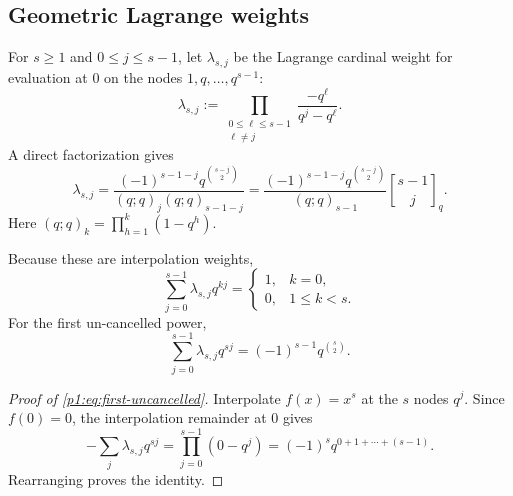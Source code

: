 \documentclass[11pt]{article}
\numberwithin{equation}{section}
\theoremstyle{definition}
\theoremstyle{remark}
\newcommand{\qbinom}[3]{\genfrac{[}{]}{0pt}{}{#1}{#2}_{#3}}
\begin{document}
\subsection{Geometric Lagrange weights}

For $s\ge1$ and $0\le j\le s-1$, let $\lambda_{s,j}$ be the Lagrange cardinal weight for evaluation at $0$ on the nodes $1,q,\ldots,q^{s-1}$:
\begin{equation}
 \lambda_{s,j}:=\prod_{\substack{0\le\ell\le s-1\\\ell\ne j}}
 \frac{-q^\ell}{q^j-q^\ell}.
 \label{p1:eq:lambda-Lagrange}
\end{equation}
A direct factorization gives
\begin{equation}
 \boxed{
 \lambda_{s,j}
 =\frac{(-1)^{s-1-j}q^{\binom{s-j}{2}}}
 {(q;q)_j(q;q)_{s-1-j}}
 =\frac{(-1)^{s-1-j}q^{\binom{s-j}{2}}}{(q;q)_{s-1}}
 \qbinom{s-1}{j}{q}.}
 \label{p1:eq:lambda-qbinomial}
\end{equation}
Here
\((q;q)_k=\prod_{h=1}^{k}(1-q^h)\).

Because these are interpolation weights,
\begin{equation}
 \sum_{j=0}^{s-1}\lambda_{s,j}q^{kj}
 =\begin{cases}
 1,&k=0,\\
 0,&1\le k<s.
 \end{cases}
 \label{p1:eq:lambda-cancellation}
\end{equation}
For the first un-cancelled power,
\begin{equation}
 \sum_{j=0}^{s-1}\lambda_{s,j}q^{sj}
 =(-1)^{s-1}q^{\binom s2}.
 \label{p1:eq:first-uncancelled}
\end{equation}

\begin{proof}[Proof of \eqref{p1:eq:first-uncancelled}]
Interpolate $f(x)=x^s$ at the $s$ nodes $q^j$.  Since $f(0)=0$, the interpolation remainder at $0$ gives
\[
 -\sum_j\lambda_{s,j}q^{sj}
 =\prod_{j=0}^{s-1}(0-q^j)
 =(-1)^sq^{0+1+\cdots+(s-1)}.
\]
Rearranging proves the identity.
\end{proof}
\end{document}
